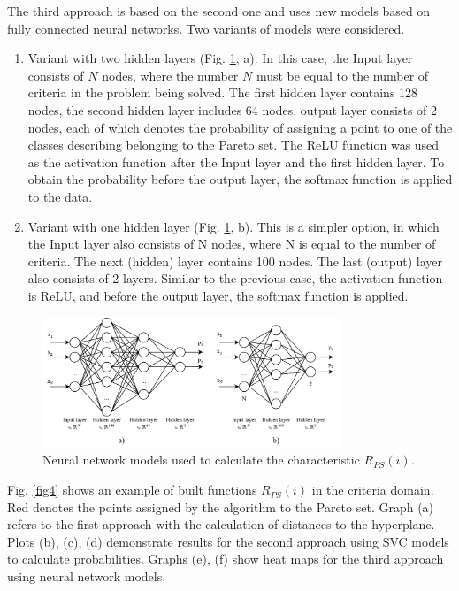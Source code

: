\documentclass[runningheads]{llncs}
\begin{document}
The third approach is based on the second one and uses new models based on fully connected neural networks. Two variants of models were considered.
\begin{enumerate}
	\item Variant with two hidden layers (Fig. \ref{fig3}, a). In this case, the Input layer consists of $N$ nodes, where the number $N$ must be equal to the number of criteria in the problem being solved. The first hidden layer contains 128 nodes, the second hidden layer includes 64 nodes, output layer consists of 2 nodes, each of which denotes the probability of assigning a point to one of the classes describing belonging to the Pareto set. The ReLU function was used as the activation function after the Input layer and the first hidden layer. To obtain the probability before the output layer, the softmax function is applied to the data.
	\item Variant with one hidden layer (Fig. \ref{fig3}, b).  This is a simpler option, in which the Input layer also consists of N nodes, where N is equal to the number of criteria. The next (hidden) layer contains 100 nodes. The last (output) layer also consists of 2 layers. Similar to the previous case, the activation function is ReLU, and before the output layer, the softmax function is applied.
\end{enumerate}

\begin{figure}
\center
\includegraphics[width=0.8\textwidth]{fig3.png}
\caption{Neural network models used to calculate the characteristic $R_{PS}(i)$.} \label{fig3}
\end{figure}

Fig. \ref{fig4} shows an example of built functions $R_{PS}(i)$ in the criteria domain. Red denotes the points assigned by the algorithm to the Pareto set. Graph (a) refers to the first approach with the calculation of distances to the hyperplane. Plots (b), (c), (d) demonstrate results for the second approach using SVC models to calculate probabilities. Graphs (e), (f) show heat maps for the third approach using neural network models.
\end{document}
